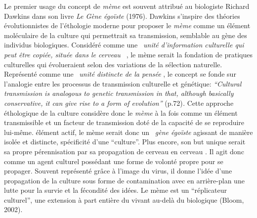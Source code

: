 Le premier usage du concept de \textit{mème} est souvent attribué au biologiste Richard Dawkins dans son livre \textit{Le Gène égo\"iste }(1976). Dawkins s{\textquoteright}inspire des théories évolutionnistes de l{\textquoteright}éthologie moderne pour proposer le \textit{mème} comme un élément moléculaire de la culture qui permettrait sa transmission, semblable au gène des individus biologiques. Considéré comme une \textit{{\guillemotleft}~unité d{\textquoteright}information culturelle qui peut être copiée, située dans le cerveau~{\guillemotright}} \citep{Blackmore2001}, le mème serait la fondation de pratiques culturelles qui évolueraient selon des variations de la sélection naturelle. Représenté comme une {\guillemotleft}~\textit{unité distincte de la pensée {\guillemotright}} \citep{Dawkins1989}, le concept se fonde sur l{\textquoteright}analogie entre les processus de transmission culturelle et génétique: \textit{{\textquotedblleft}Cultural transmission is analogous to genetic transmission in that, although basically conservative, it can give rise to a form of evolution{\textquotedblright} }(p.72)\textit{.} Cette approche éthologique de la culture considère donc le \textit{mème} à la fois comme un élément transmissible et un facteur de transmission doté de la capacité de se reproduire lui-même. élément actif, le mème serait donc un \textit{{\guillemotleft}~gène égo\"iste {\guillemotright} }agissant de manière isolée et distincte, spécificité d{\textquoteright}une {\textquotedblleft}culture{\textquotedblright}. Plus encore, son but unique serait sa propre pérennisation par sa propagation de cerveau en cerveau \citep{Blackmore1997}. Il agit donc comme un agent culturel possédant une forme de volonté propre pour se propager. Souvent représenté gr\^ace à l{\textquoteright}image du virus, il donne l{\textquoteright}idée d{\textquoteright}une propagation de la culture sous forme de contamination avec en arrière-plan une lutte pour la survie et la fécondité des idées. Le mème est un {\textquotedblleft}réplicateur culturel{\textquotedblright}, une extension à part entière du vivant au-delà du biologique (Bloom, 2002). 

